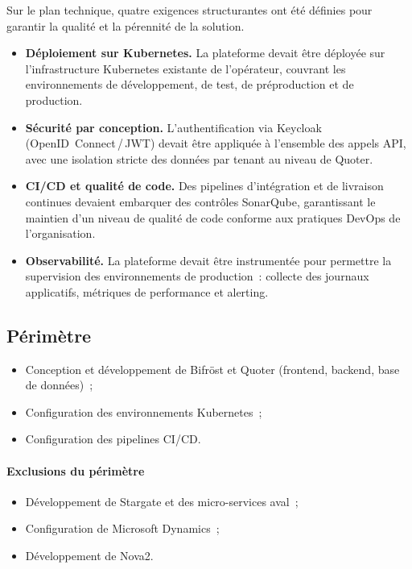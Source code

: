 Sur le plan technique, quatre exigences structurantes ont \'et\'e d\'efinies pour garantir la qualit\'e et la p\'erennit\'e de la solution.

\begin{itemize}[label=\textendash]
    \item \textbf{D\'eploiement sur Kubernetes.} La plateforme devait \^etre d\'eploy\'ee sur l'infrastructure Kubernetes existante de l'op\'erateur, couvrant les environnements de d\'eveloppement, de test, de pr\'eproduction et de production.
    
    \item \textbf{S\'ecurit\'e par conception.} L'authentification via Keycloak (OpenID~Connect\,/\,JWT) devait \^etre appliqu\'ee \`a l'ensemble des appels API, avec une isolation stricte des donn\'ees par tenant au niveau de Quoter.
    
    \item \textbf{CI/CD et qualit\'e de code.} Des pipelines d'int\'egration et de livraison continues devaient embarquer des contr\^oles SonarQube, garantissant le maintien d'un niveau de qualit\'e de code conforme aux pratiques DevOps de l'organisation.
    
    \item \textbf{Observabilit\'e.} La plateforme devait \^etre instrument\'ee pour permettre la supervision des environnements de production~: collecte des journaux applicatifs, m\'etriques de performance et alerting.
\end{itemize}

\subsection{P\'erim\`etre}

\begin{itemize}[label=\textendash]
    \item Conception et d\'eveloppement  de Bifr\"ost et Quoter (frontend, backend, base de donn\'ees)~;
    \item Configuration des environnements Kubernetes~;
    \item Configuration des pipelines CI/CD.
\end{itemize}

\paragraph{Exclusions du p\'erim\`etre}
\begin{itemize}[label=\textendash]
    \item D\'eveloppement de Stargate et des micro-services aval~;
    \item Configuration de Microsoft Dynamics~;
    \item D\'eveloppement de Nova2.
\end{itemize}

